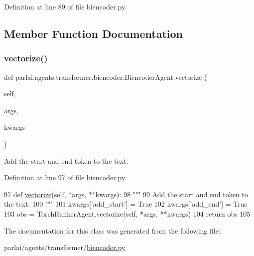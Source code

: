Definition at line 89 of file biencoder.\+py.



\subsection{Member Function Documentation}
\mbox{\label{classparlai_1_1agents_1_1transformer_1_1biencoder_1_1BiencoderAgent_a0a75b68e9e6877358245f85bcb438d03}} 
\subsubsection{\texorpdfstring{vectorize()}{vectorize()}}
{\footnotesize\ttfamily def parlai.\+agents.\+transformer.\+biencoder.\+Biencoder\+Agent.\+vectorize (\begin{DoxyParamCaption}\item[{}]{self,  }\item[{}]{args,  }\item[{}]{kwargs }\end{DoxyParamCaption})}

\begin{DoxyVerb}Add the start and end token to the text.
\end{DoxyVerb}
 

Definition at line 97 of file biencoder.\+py.


\begin{DoxyCode}
97     \textcolor{keyword}{def }\hyperlink{namespaceparlai_1_1agents_1_1drqa_1_1utils_a5c76cc39e3014c7bcf9199d566dbdc0f}{vectorize}(self, *args, **kwargs):
98         \textcolor{stringliteral}{"""}
99 \textcolor{stringliteral}{        Add the start and end token to the text.}
100 \textcolor{stringliteral}{        """}
101         kwargs[\textcolor{stringliteral}{'add\_start'}] = \textcolor{keyword}{True}
102         kwargs[\textcolor{stringliteral}{'add\_end'}] = \textcolor{keyword}{True}
103         obs = TorchRankerAgent.vectorize(self, *args, **kwargs)
104         \textcolor{keywordflow}{return} obs
105 
\end{DoxyCode}


The documentation for this class was generated from the following file\+:\begin{DoxyCompactItemize}
\item 
parlai/agents/transformer/\hyperlink{biencoder_8py}{biencoder.\+py}\end{DoxyCompactItemize}

